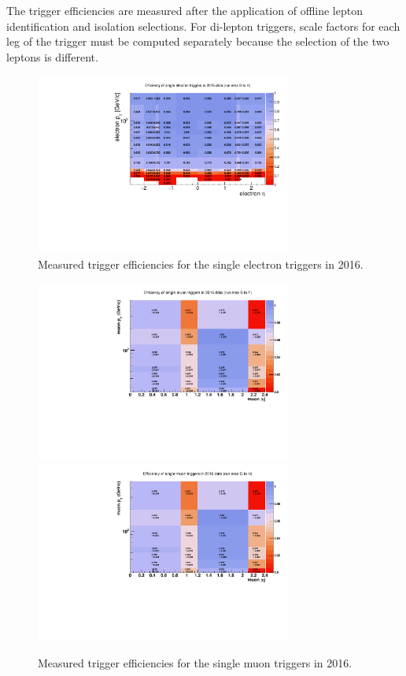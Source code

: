 The trigger efficiencies are measured after the application of offline lepton 
identification and isolation selections.  For di-lepton triggers, scale factors for 
each leg of the trigger must be computed separately because the selection of the 
two leptons is different. 

\begin{figure}[hbtp]\begin{center}
    \includegraphics[width=0.75\textwidth]{figures/triggerstudies/singleElectronTrigger_Run2016BCDEFGH.pdf}
       \caption{Measured trigger efficiencies for the single electron triggers in 2016.}
 \label{fig:triggereffal}
 \end{center}
 \end{figure}
\begin{figure}[hbtp]\begin{center}
    \includegraphics[width=0.75\textwidth]{figures/triggerstudies/singleMuonTrigger_Run2016BCDEF.pdf}
    \includegraphics[width=0.75\textwidth]{figures/triggerstudies/singleMuonTrigger_Run2016GH.pdf}
       \caption{Measured trigger efficiencies for the single muon triggers in 2016.}
 \label{fig:triggereffal}
 \end{center}
 \end{figure}


